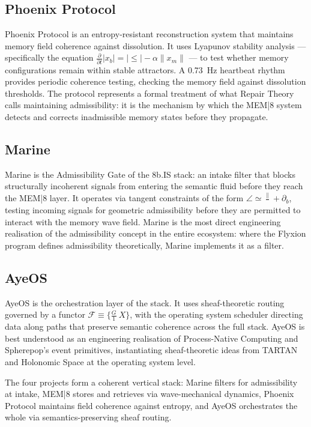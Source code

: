 \documentclass[12pt, twoside]{article}
\begin{document}
\subsection*{Phoenix Protocol}

Phoenix Protocol is an entropy-resistant reconstruction system that
maintains memory field coherence against dissolution. It uses Lyapunov
stability analysis — specifically the equation $\frac{\partial}{\partial t}
|x_b| = |\leq| - \alpha \|x_m\|$ — to test whether memory configurations
remain within stable attractors. A 0.73~Hz heartbeat rhythm provides
periodic coherence testing, checking the memory field against dissolution
thresholds. The protocol represents a formal treatment of what Repair Theory
calls maintaining admissibility: it is the mechanism by which the MEM|8
system detects and corrects inadmissible memory states before they propagate.

\subsection*{Marine}

Marine is the Admissibility Gate of the 8b.IS stack: an intake filter that
blocks structurally incoherent signals from entering the semantic fluid before
they reach the MEM|8 layer. It operates via tangent constraints of the form
$\angle \simeq \frac{\|}{} + \partial_b$, testing incoming signals for
geometric admissibility before they are permitted to interact with the memory
wave field. Marine is the most direct engineering realisation of the
admissibility concept in the entire ecosystem: where the Flyxion program
defines admissibility theoretically, Marine implements it as a filter.

\subsection*{AyeOS}

AyeOS is the orchestration layer of the stack. It uses sheaf-theoretic routing
governed by a functor $\mathcal{F} \equiv \bigl\{\frac{G}{1}\ X\bigr\}$, with
the operating system scheduler directing data along paths that preserve
semantic coherence across the full stack. AyeOS is best understood as an
engineering realisation of Process-Native Computing and Spherepop's event
primitives, instantiating sheaf-theoretic ideas from TARTAN and Holonomic
Space at the operating system level.

The four projects form a coherent vertical stack: Marine filters for
admissibility at intake, MEM|8 stores and retrieves via wave-mechanical
dynamics, Phoenix Protocol maintains field coherence against entropy, and
AyeOS orchestrates the whole via semantics-preserving sheaf routing.
\end{document}
